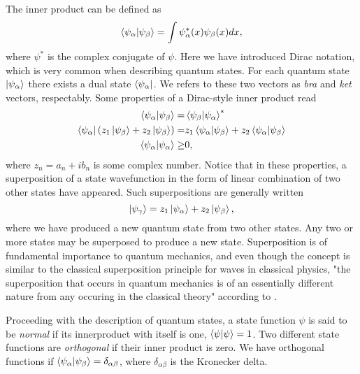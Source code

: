     The inner product can be defined as 
    \begin{equation}
        \braket{\psi_\alpha}{\psi_\beta} = \int \psi_\alpha^*(x) \psi_\beta(x)dx,
    \end{equation}
    where $\psi^*$ is the complex conjugate of $\psi$. Here we have introduced 
    Dirac notation, which is very common when describing quantum states. For each 
    quantum state $\ket{\psi_\alpha}$ there exists a dual state $\bra{\psi_\alpha}$.
    We refers to these two vectors as \emph{bra} and \emph{ket} vectors, respectably.
    Some properties of a Dirac-style inner product read
    \begin{align}
        \braket{\psi_\alpha}{\psi_\beta} =& \braket{\psi_\beta}{\psi_\alpha}^* \\
        \bra{\psi_\alpha}\left(z_1\ket{\psi_\beta} + z_2 \ket{\psi_\beta}\right)
            =& z_1 \braket{\psi_\alpha}{\psi_\beta} + z_2\braket{\psi_\alpha}{\psi_\beta} \\
        \braket{\psi_\alpha} \geq& 0,
    \end{align}
    where $z_n = a_n + ib_n$ is some complex number. Notice that in these properties, a 
    superposition of a state wavefunction in the form of linear combination of two other 
    states have appeared. Such superpositions are generally written
    \begin{equation}
        \label{eq:superposition}
        \ket{\psi_\gamma} = z_1\ket{\psi_\alpha} + z_2\ket{\psi_\beta},
    \end{equation}
    where we have produced a new quantum state from two other states. Any two or more
    states may be superposed to produce a new state. Superposition is of fundamental 
    importance to quantum mechanics, and even though the concept is similar to the 
    classical superposition principle for waves in classical physics, "the superposition 
    that occurs in quantum mechanics is of an essentially different nature from any 
    occuring in the classical theory" according 
    to \citeauthor{dirac1930principles}\cite{dirac1930principles}.

    Proceeding with the description of quantum states, a state function $\psi$ is said 
    to be \emph{normal} if its innerproduct with itself is one, $\braket{\psi}{\psi} = 1$.
    Two different state functions are \emph{orthogonal} if their inner product is zero. 
    We have orthogonal functions if $\braket{\psi_\alpha}{\psi_\beta} = \delta_{\alpha\beta}$,
    where $\delta_{\alpha\beta}$ is the Kronecker delta.


